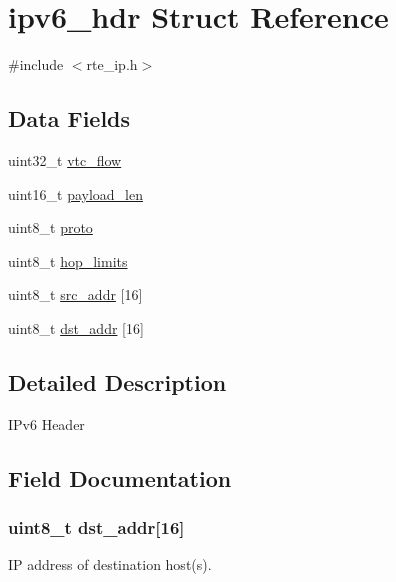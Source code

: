 \hypertarget{structipv6__hdr}{}\section{ipv6\+\_\+hdr Struct Reference}
\label{structipv6__hdr}


{\ttfamily \#include $<$rte\+\_\+ip.\+h$>$}

\subsection*{Data Fields}
\begin{DoxyCompactItemize}
\item 
uint32\+\_\+t \hyperlink{structipv6__hdr_acdbd04b4952ce247bad761255dab2ff5}{vtc\+\_\+flow}
\item 
uint16\+\_\+t \hyperlink{structipv6__hdr_a275f869dbba91f4716540a49b6c22532}{payload\+\_\+len}
\item 
uint8\+\_\+t \hyperlink{structipv6__hdr_adaae928b69788f774db092e75f1c4fb7}{proto}
\item 
uint8\+\_\+t \hyperlink{structipv6__hdr_a00877d99c569e5b16e1d7141e7354536}{hop\+\_\+limits}
\item 
uint8\+\_\+t \hyperlink{structipv6__hdr_a6986cf27ec82df0bdd16f9d574a9a009}{src\+\_\+addr} \mbox{[}16\mbox{]}
\item 
uint8\+\_\+t \hyperlink{structipv6__hdr_a25c3a64d5cf7e63211898df5ed65cd22}{dst\+\_\+addr} \mbox{[}16\mbox{]}
\end{DoxyCompactItemize}


\subsection{Detailed Description}
I\+Pv6 Header 

\subsection{Field Documentation}
\hypertarget{structipv6__hdr_a25c3a64d5cf7e63211898df5ed65cd22}{}
\subsubsection[{dst\+\_\+addr}]{\setlength{\rightskip}{0pt plus 5cm}uint8\+\_\+t dst\+\_\+addr\mbox{[}16\mbox{]}}\label{structipv6__hdr_a25c3a64d5cf7e63211898df5ed65cd22}
I\+P address of destination host(s). \hypertarget{structipv6__hdr_a00877d99c569e5b16e1d7141e7354536}{}
